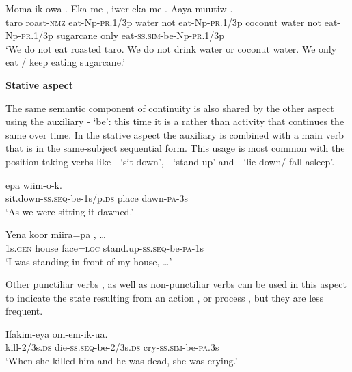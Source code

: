 \ea%
\label{ex:3:x1049}
\gll Moma ik-owa . Eka me , iwer eka me . Aaya muutiw .\\
taro roast-\textsc{nmz} eat-Np-\textsc{pr}.1/3p water not eat-Np-\textsc{pr}.1/3p coconut water not eat-Np-\textsc{pr}.1/3p sugarcane only eat-\textsc{ss}.\textsc{sim}-be-Np-\textsc{pr}.1/3p\\
\glt`We do not eat roasted taro. We do not drink water or coconut water. We only eat / keep eating sugarcane.'
\z

{\bfseries
{}
Stative aspect}

The same semantic component of continuity is also shared by the other aspect using the auxiliary - `be': this time it is a  rather than activity that continues the same over time. In the stative aspect the auxiliary is combined with a main verb that is in the same-subject sequential form. This usage is most common with the position-taking verbs like - `sit down', - `stand up' and - `lie down/ fall asleep'.

\ea%
\label{ex:3:x356}
\gll {}  epa wiim-o-k. \\
sit.down-\textsc{ss}.\textsc{seq}-be-1s/p.\textsc{ds} place dawn-\textsc{pa}-3s \\
\glt`As we were sitting it dawned.'
\z

\ea%
\label{ex:3:x1046}
\gll Yena koor miira=pa , {\dots} \\
1s.\textsc{gen} house face=\textsc{loc} stand.up-\textsc{ss}.\textsc{seq}-be-\textsc{pa}-1s\\
\glt`I was standing in front of my house, {\dots}'
\z

Other punctiliar verbs , as well as non-punctiliar verbs can be used in this aspect to indicate the state resulting from an action , or process , but they are less frequent.

\ea%
\label{ex:3:x357}
\gll Ifakim-eya   om-em-ik-ua. \\
kill-2/3s.\textsc{ds} die-\textsc{ss}.\textsc{seq}-be-2/3s.\textsc{ds} cry-\textsc{ss}.\textsc{sim}-be-\textsc{pa}.3s\\
\glt`When she killed him and he was dead, she was crying.'
\z

